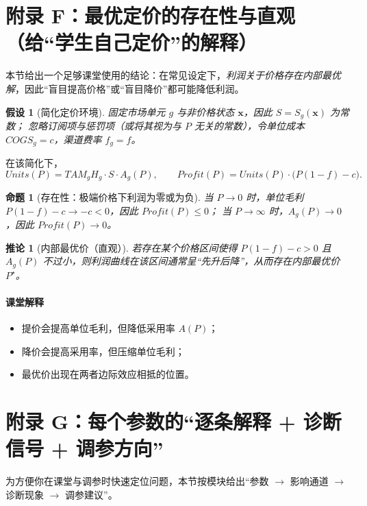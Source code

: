 \documentclass[UTF8,12pt]{ctexart}
\newtheorem{proposition}{命题}
\newtheorem{corollary}{推论}
\newtheorem{assumption}{假设}
\begin{document}
\clearpage
\section{附录 F：最优定价的存在性与直观（给“学生自己定价”的解释）}

本节给出一个足够课堂使用的结论：在常见设定下，\emph{利润关于价格存在内部最优解}，因此“盲目提高价格”或“盲目降价”都可能降低利润。

\begin{assumption}[简化定价环境]
固定市场单元 $g$ 与非价格状态 $\mathbf{x}$，因此 $S=S_g(\mathbf{x})$ 为常数；
忽略订阅项与惩罚项（或将其视为与 $P$ 无关的常数），令单位成本 $COGS_g=c$，渠道费率 $f_g=f$。
\end{assumption}

在该简化下，
\[
Units(P)=TAM_gH_g\cdot S\cdot A_g(P),
\qquad
Profit(P)=Units(P)\cdot \big(P(1-f)-c\big).
\]

\begin{proposition}[存在性：极端价格下利润为零或为负]
当 $P\to 0$ 时，单位毛利 $P(1-f)-c\to -c<0$，因此 $Profit(P)\le 0$；
当 $P\to \infty$ 时，$A_g(P)\to 0$，因此 $Profit(P)\to 0$。
\end{proposition}

\begin{corollary}[内部最优价（直观）]
若存在某个价格区间使得 $P(1-f)-c>0$ 且 $A_g(P)$ 不过小，则利润曲线在该区间通常呈“先升后降”，从而存在内部最优价 $P^\star$。
\end{corollary}

\paragraph{课堂解释}
\begin{itemize}
  \item 提价会提高单位毛利，但降低采用率 $A(P)$；
  \item 降价会提高采用率，但压缩单位毛利；
  \item 最优价出现在两者边际效应相抵的位置。
\end{itemize}

\clearpage
\section{附录 G：每个参数的“逐条解释 + 诊断信号 + 调参方向”}

为方便你在课堂与调参时快速定位问题，本节按模块给出“参数 $\rightarrow$ 影响通道 $\rightarrow$ 诊断现象 $\rightarrow$ 调参建议”。
\end{document}
